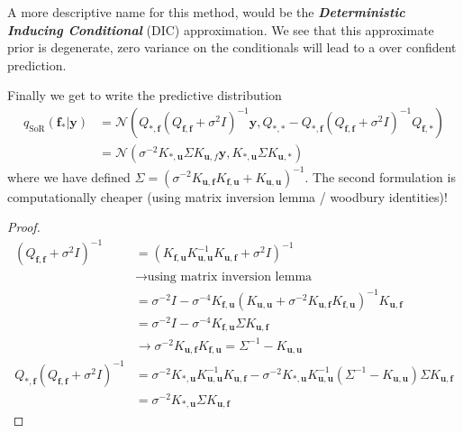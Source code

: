 \documentclass[10pt]{elegantbook}
\newcommand{\mydefination}[1]{\textbf{\textit{\textcolor{structurecolor}{#1}}}}
\begin{document}
A more descriptive name for this method, would be the
\mydefination{Deterministic Inducing Conditional} (DIC) approximation. We see that this approximate prior is
degenerate, zero variance on the conditionals will lead to a over confident prediction.

Finally we get to write the predictive distribution
\begin{equation}
    \begin{aligned}
    q_{\text{SoR}}(\mathbf f_* | \mathbf y) &= \mathcal N \left (
        Q_{*, \mathbf f} (Q_{\mathbf f, \mathbf f} + \sigma^2 I)^{-1} \mathbf y,
        Q_{*, *} - Q_{*, \mathbf f} (Q_{\mathbf f, \mathbf f} + \sigma^2 I)^{-1} Q_{\mathbf f, *}
        \right ) \\
        &= \mathcal N \left (
            \sigma^{-2} K_{*, \mathbf u} \Sigma K_{\mathbf u, f} \mathbf y,
            K_{*, \mathbf u} \Sigma K_{\mathbf u, *}
            \right )
    \end{aligned}
\end{equation}
where we have defined $\Sigma = (\sigma^{-2} K_{\mathbf u, \mathbf f} K_{\mathbf f, \mathbf u} + K_{\mathbf u, \mathbf u})^{-1}$. The 
second formulation is computationally cheaper (using matrix inversion lemma / woodbury identities)!

\begin{proof}
    \[
    \begin{aligned}
        (Q_{\mathbf f, \mathbf f} + \sigma^2 I)^{-1} 
        &= (K_{\mathbf{f, u}} K_{\mathbf{u, u}}^{-1} K_{\mathbf{u, f}} + \sigma^2 I)^{-1} \\
        &\rightarrow \text{using matrix inversion lemma} \\
        &= \sigma^{-2} I - \sigma^{-4} K_{\mathbf{f, u}} (K_{\mathbf{u, u}} + \sigma^{-2} K_{\mathbf{u, f}} K_{\mathbf{f, u}})^{-1} K_{\mathbf{u, f}} \\
        &= \sigma^{-2} I - \sigma^{-4} K_{\mathbf{f, u}} \Sigma K_{\mathbf{u, f}} \\
        &\rightarrow \sigma^{-2} K_{\mathbf{u, f}} K_{\mathbf{f, u}} = \Sigma^{-1} - K_{\mathbf{u, u}} \\
        Q_{*, \mathbf f} (Q_{\mathbf f, \mathbf f} + \sigma^2 I)^{-1}
        &= \sigma^{-2} K_{\mathbf{*, u}} K_{\mathbf{u, u}}^{-1} K_{\mathbf{u, f}} - \sigma^{-2} K_{\mathbf{*, u}} K_{\mathbf{u, u}}^{-1} (\Sigma^{-1} - K_{\mathbf{u, u}}) \Sigma K_{\mathbf{u, f}} \\
        &= \sigma^{-2} K_{\mathbf{*, u}} \Sigma K_{\mathbf{u, f}}
    \end{aligned}
    \]
\end{proof}
\end{document}
